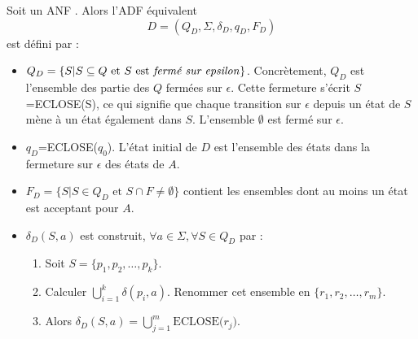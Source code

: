 Soit un ANF \automaton. Alors l'ADF équivalent
$$
D=(Q_D, \Sigma, \delta_D, q_D, F_D)
$$
est défini par :
\begin{itemize}
	\item $Q_D = \{S | S \subseteq Q \text{ et } S \text{ est \emph{fermé sur epsilon}}\}$. Concrètement, $Q_D$ est l'ensemble des partie des $Q$ fermées sur $\epsilon$. Cette fermeture s'écrit $S$=ECLOSE(S), ce qui signifie que chaque transition sur $\epsilon$ depuis un état de $S$ mène à un état également dans $S$. L'ensemble $\emptyset$ est fermé sur $\epsilon$.
	\item $q_D$=ECLOSE($q_0$). L'état initial de $D$ est l'ensemble des états dans la fermeture sur $\epsilon$ des états de $A$.
	\item $F_D= \{S|S \in Q_D \text{ et } S \cap F \neq \emptyset\}$ contient les ensembles dont au moins un état est acceptant pour $A$.
	\item $\delta_D(S,a)$ est construit, $\forall a \in \Sigma, \forall S \in Q_D$ par :
		\begin{enumerate}
			\item Soit $S=\{p_1, p_2,\dots,p_k\}$.
			\item Calculer $\bigcup_{i=1}^k\delta(p_i,a)$. Renommer cet ensemble en $\{r_1, r_2, \dots, r_m\}$.
			\item Alors $\delta_D(S,a)=\bigcup_{j=1}^m\text{ECLOSE(}r_j\text{)}$.
		\end{enumerate}
\end{itemize}


